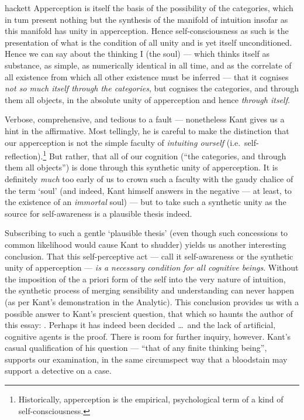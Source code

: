 \begin{displaycquote}[A399]{hackett}
  Apperception is itself the basis of the possibility of the categories, which in tum present nothing but the synthesis of the manifold of intuition insofar as this manifold has unity in apperception. Hence self-consciousness as such is the presentation of what is the condition of all unity and is yet itself unconditioned. Hence we can say about the thinking I (the soul) --- which thinks itself as substance, as simple, as numerically identical in all time, and as the correlate of all existence from which all other existence must be inferred --- that it cognises \emph{not so much itself through the categories}, but cognises the categories, and through them all objects, in the absolute unity of apperception and hence \emph{through itself}.
\end{displaycquote}

\noindent
Verbose, comprehensive, and tedious to a fault --- nonetheless Kant gives us a hint in the affirmative. Most tellingly, he is careful to make the distinction that our apperception is not the simple faculty of \emph{intuiting ourself} (i.e.\ self-reflection).\footnote{Historically, apperception is the empirical, psychological term of a kind of self-consciousness.} But rather, that all of our cognition (\enquote{the categories, and through them all objects}) is done through this synthetic unity of apperception. It is definitely \emph{much} too early of us to crown such a faculty with the gaudy chalice of the term \enquote*{soul} (and indeed, Kant himself answers in the negative --- at least, to the existence of an \emph{immortal} soul) --- but to take such a synthetic unity as the source for self-awareness is a plausible thesis indeed.

Subscribing to such a gentle \enquote*{plausible thesis} (even though such concessions to common likelihood would cause Kant to shudder) yields us another interesting conclusion. That this self-perceptive act --- call it self-awareness or the synthetic unity of apperception --- \emph{is a necessary condition for all cognitive beings}. Without the imposition of the a priori form of the self into the very nature of intuition, the synthetic process of merging sensibility and understanding can never happen (as per Kant's demonstration in the Analytic). This conclusion provides us with a possible answer to Kant's prescient question, that which so haunts the author of this essay: . Perhaps it has indeed been decided \ldots\ and the lack of artificial, cognitive agents is the proof. There is room for further inquiry, however. Kant's casual qualification of his question --- \enquote{that of any finite thinking being}, supports our examination, in the same circumspect way that a bloodstain may support a detective on a case.

